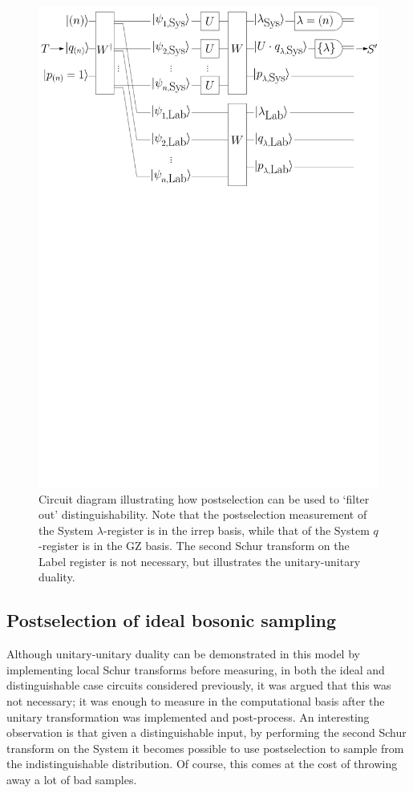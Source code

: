 \begin{figure}
\includegraphics[width=\linewidth]{noisy_circuit/post_circuit}
\caption{Circuit diagram illustrating how postselection can be used to `filter out' distinguishability.
Note that the postselection measurement of the System $\lambda$-register is in the irrep basis, while that of the System $q$-register is in the GZ basis.
The second Schur transform on the Label register is not necessary, but illustrates the unitary-unitary duality.}
\label{fig:noisy-bs-rep}
\end{figure}


\subsection{Postselection of ideal bosonic sampling}
\label{sec:post-bs}

Although unitary-unitary duality can be demonstrated in this model by implementing local Schur transforms before measuring, in both the ideal and distinguishable case circuits considered previously, it was argued that this was not necessary; it was enough to measure in the computational basis after the unitary transformation was implemented and post-process.
An interesting observation is that given a distinguishable input, by performing the second Schur transform on the System it becomes possible to use postselection to sample from the indistinguishable distribution.
Of course, this comes at the cost of throwing away a lot of bad samples.

